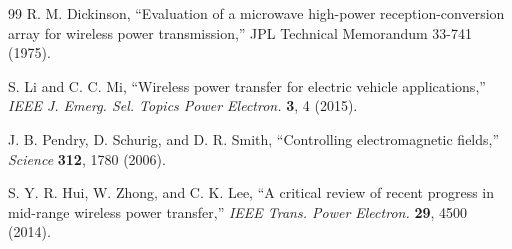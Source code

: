 \documentclass[aps,prd,twocolumn,superscriptaddress,nofootinbib]{revtex4-2}
\begin{document}
\begin{thebibliography}{99}
R. M. Dickinson, ``Evaluation of a microwave high-power reception-conversion
array for wireless power transmission,'' JPL Technical Memorandum 33-741 (1975).

S. Li and C. C. Mi, ``Wireless power transfer for electric vehicle
applications,'' \textit{IEEE J. Emerg. Sel. Topics Power Electron.}
\textbf{3}, 4 (2015).

J. B. Pendry, D. Schurig, and D. R. Smith, ``Controlling electromagnetic
fields,'' \textit{Science} \textbf{312}, 1780 (2006).

S. Y. R. Hui, W. Zhong, and C. K. Lee, ``A critical review of recent
progress in mid-range wireless power transfer,''
\textit{IEEE Trans. Power Electron.} \textbf{29}, 4500 (2014).

\end{thebibliography}
\end{document}
